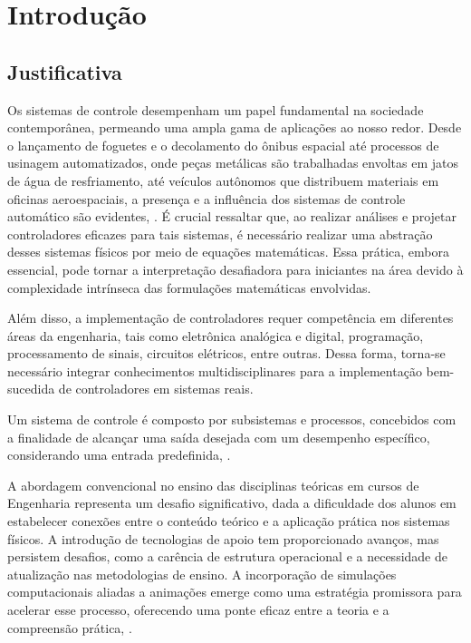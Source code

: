 
\chapter{Introdução}
\label{ch:intro}

\section{Justificativa}

Os sistemas de controle desempenham um papel fundamental na sociedade contemporânea, permeando uma ampla gama de aplicações ao nosso redor. Desde o lançamento de foguetes e o decolamento do ônibus espacial até processos de usinagem automatizados, onde peças metálicas são trabalhadas envoltas em jatos de água de resfriamento, até veículos autônomos que distribuem materiais em oficinas aeroespaciais, a presença e a influência dos sistemas de controle automático são evidentes, \cite{nise2013}. É crucial ressaltar que, ao realizar análises e projetar controladores eficazes para tais sistemas, é necessário realizar uma abstração desses sistemas físicos por meio de equações matemáticas. Essa prática, embora essencial, pode tornar a interpretação desafiadora para iniciantes na área devido à complexidade intrínseca das formulações matemáticas envolvidas.

Além disso, a implementação de controladores requer competência em diferentes áreas da engenharia, tais como eletrônica analógica e digital, programação, processamento de sinais, circuitos elétricos, entre outras. Dessa forma, torna-se necessário integrar conhecimentos multidisciplinares para a implementação bem-sucedida de controladores em sistemas reais.

Um sistema de controle é composto por subsistemas e processos, concebidos com a finalidade de alcançar uma saída desejada com um desempenho específico, considerando uma entrada predefinida, \cite{nise2013}.

A abordagem convencional no ensino das disciplinas teóricas em cursos de Engenharia representa um desafio significativo, dada a dificuldade dos alunos em estabelecer conexões entre o conteúdo teórico e a aplicação prática nos sistemas físicos. A introdução de tecnologias de apoio tem proporcionado avanços, mas persistem desafios, como a carência de estrutura operacional e a necessidade de atualização nas metodologias de ensino. A incorporação de simulações computacionais aliadas a animações emerge como uma estratégia promissora para acelerar esse processo, oferecendo uma ponte eficaz entre a teoria e a compreensão prática, \cite{yuri_tcc}.

